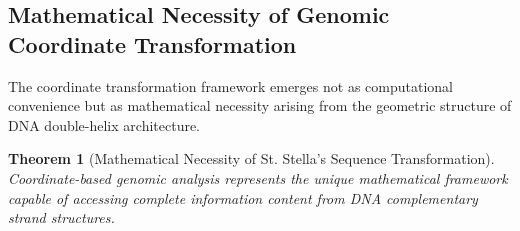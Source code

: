 \documentclass[12pt,a4paper]{article}
\newtheorem{theorem}{Theorem}
\begin{document}
\subsection{Mathematical Necessity of Genomic Coordinate Transformation}

The coordinate transformation framework emerges not as computational convenience but as mathematical necessity arising from the geometric structure of DNA double-helix architecture.

\begin{theorem}[Mathematical Necessity of St. Stella's Sequence Transformation]
Coordinate-based genomic analysis represents the unique mathematical framework capable of accessing complete information content from DNA complementary strand structures.
\end{theorem}
\end{document}
